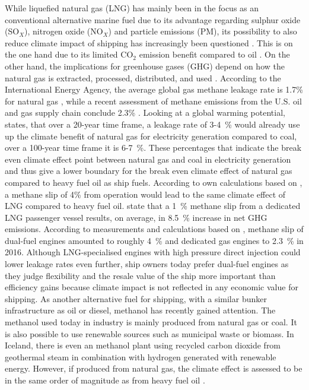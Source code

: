 \documentclass[article]{elsarticle}
\begin{document}
While liquefied natural gas (LNG) has mainly been in the focus as an conventional alternative marine fuel \cite{IMO2016a,DNVGL2015} due to its advantage regarding sulphur oxide (SO$_X$), nitrogen oxide (NO$_X$) and particle emissions (PM), its possibility to also reduce climate impact of shipping has increasingly been questioned \cite{BRYNOLF2014b}. This is on the one hand due to its limited CO$_2$ emission benefit compared to oil \cite{DNVGL2014}. On the other hand, the implications for greenhouse gases (GHG) depend on how the natural gas is extracted, processed, distributed, and used \cite{THOMSON2015}. According to the International Energy Agency, the average global gas methane leakage rate is 1.7\% for natural gas \cite{IEA2017}, while a recent assessment of methane emissions from the U.S. oil and gas supply chain conclude 2.3\% \cite{Alvarez2018}. Looking at a global warming potential, \citet{IEA2017} states, that over a 20-year time frame, a leakage rate of 3-4~\% would already use up the climate benefit of natural gas for electricity generation compared to coal, over a 100-year time frame it is 6-7~\%. These percentages that indicate the break even climate effect point between natural gas and coal in electricity generation and thus give a lower boundary for the break even climate effect of natural gas compared to heavy fuel oil as ship fuels. According to own calculations based on \cite{BRYNOLF2014}, a methane slip of 4\% from operation would lead to the same climate effect of LNG compared to heavy fuel oil. \citet{HAGOS2018} state that a 1~\% methane slip from a dedicated LNG passenger vessel results, on average, in 8.5~\% increase in net GHG emissions. According to measurements and calculations based on \cite{Corbett2015,Stenersen2017}, methane slip of dual-fuel engines amounted to roughly 4~\% and dedicated gas engines to 2.3~\% in 2016. Although LNG-specialised engines with high pressure direct injection could lower leakage rates even further, ship owners today prefer dual-fuel engines as they judge flexibility and the resale value of the ship more important than efficiency gains because climate impact is not reflected in any economic value for shipping. As another alternative fuel for shipping, with a similar bunker infrastructure as oil or diesel, methanol has recently gained attention. The methanol used today in industry is mainly produced from natural gas or coal. It is also possible to use renewable sources such as municipal waste or biomass. In Iceland, there is even an methanol plant using recycled carbon dioxide from geothermal steam in combination with hydrogen generated with renewable energy. However, if produced from natural gas, the climate effect is assessed to be in the same order of magnitude as from heavy fuel oil \cite{BRYNOLF2014,DNVGL2018}. 
\end{document}
